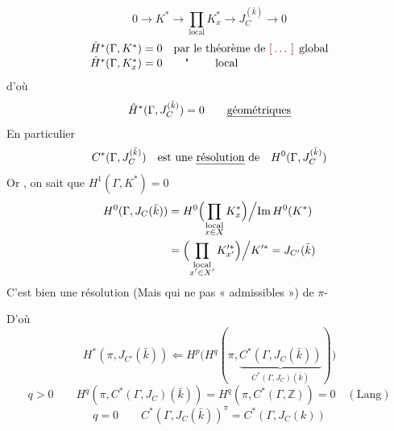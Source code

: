 \documentclass[11pt,a4paper]{article}
\begin{document}
\[
0 \to K^{*} \longrightarrow \prod_{\text{local}} K_x^{*} \longrightarrow J_C^{(\bar k)} \to 0
\]
\[
\begin{array}{ll}
\hat H^{*}(\Gamma, K^{*}) = 0 & \text{par le théorème de \ill{} global} \\
\hat H^{*}(\Gamma, K_x^{*}) = 0 & \text{\quad " \qquad local}
\end{array}
\]
d'où
\[
\hat H^{*}(\Gamma, J_C^{(\bar k)}) = 0 \qquad \text{\uncertain{géométriques}}
\]
En particulier
\[
C^{*}(\Gamma, J_C^{(\bar k)}) \quad \text{est une \emph{résolution} de} \quad H^0(\Gamma, J_C^{(\bar k)})
\]
Or \ill{} \ill{}, on sait que $H^1(\Gamma, K^{*}) = 0$
\[
\begin{aligned}
H^0(\Gamma, J_C(\bar k)) &= H^0\Bigl(\prod_{\substack{\text{local}\\ x \in X}} K_x^{*}\Bigr) \Big/ \mathrm{Im}\, H^0(K^{*}) \\
&= \Bigl(\prod_{\substack{\text{local}\\ x' \in X'}} K'^{*}_{x'}\Bigr) \Big/ K'^{*} = J_{C'}(\bar k)
\end{aligned}
\]
C'est bien une résolution (Mais qui ne  pas
« admissibles ») de $\pi$-

D'où
\[
H^{*}(\pi, J_{C'}(\bar k)) \Longleftarrow H^{p}\bigl(H^{q}(\pi, \underbrace{C^{*}(\Gamma, J_C(\bar k))}_{C^{*}(\Gamma, J_C)(\bar k)})\bigr)
\]
\[
q > 0 \qquad H^{q}(\pi, C^{*}(\Gamma, J_C)(\bar k)) = H^{q}(\pi, C^{*}(\Gamma, \mathbb{Z})) = 0 \quad (\text{Lang})
\]
\[
q = 0 \qquad C^{*}(\Gamma, J_C(\bar k))^{\pi} = C^{*}(\Gamma, J_C(k))
\]
\end{document}
